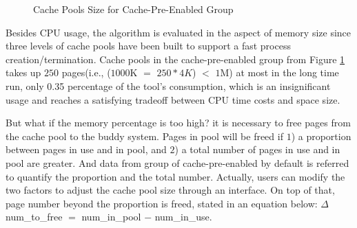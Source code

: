 \begin{figure}
\centering
{}
\hspace{1in}
\hspace{1in}
\caption{Cache Pools Size for Cache-Pre-Enabled Group}
\label{fig:prePGpool} %
\end{figure}

Besides CPU usage, the algorithm is evaluated in the aspect of memory size since three levels of cache pools have been built to support a fast process creation/termination. Cache pools in the cache-pre-enabled group from Figure \ref{fig:prePGpool} takes up $250$ pages(i.e., ($1000$K $=$ $250 * 4K$) $<$ $1$M) at most in the long time run, only 0.35 percentage of the tool's consumption, which is an insignificant usage and reaches a satisfying tradeoff between CPU time costs and space size.

But what if the memory percentage is too high? it is necessary to free pages from the cache pool to the buddy system. Pages in pool will be freed if $1$) a proportion between pages in use and in pool, and $2$) a total number of pages in use and in pool are greater. And data from group of cache-pre-enabled by default is referred to quantify the proportion and the total number. Actually, users can modify the two factors to adjust the cache pool size through an interface. On top of that, page number beyond the proportion is freed, stated in an equation below: $\Delta$num\_to\_free $=$ num\_in\_pool $-$ num\_in\_use.

